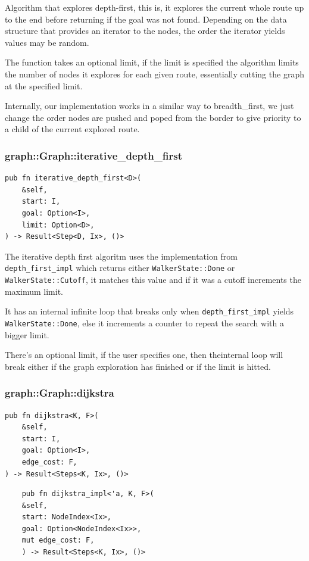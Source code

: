 Algorithm that explores depth-first, this is, it explores the current whole route up to the end before returning
if the goal was not found. Depending on the data structure that provides an iterator to the nodes, the order the
iterator yields values may be random.

The function takes an optional limit, if the limit is specified the algorithm limits the number of nodes
it explores for each given route, essentially cutting the graph at the specified limit.

Internally, our implementation works in a similar way to breadth\_first, we just change the order nodes are
pushed and poped from the border to give priority to a child of the current explored route.

\subsubsection{graph::Graph::iterative\_depth\_first}
\begin{verbatim}
pub fn iterative_depth_first<D>(
    &self,
    start: I,
    goal: Option<I>,
    limit: Option<D>,
) -> Result<Step<D, Ix>, ()>
\end{verbatim}

The iterative depth first algoritm uses the implementation from \texttt{depth\_first\_impl} which returns either
\texttt{WalkerState::Done} or \texttt{WalkerState::Cutoff}, it matches this value and if it was a cutoff
increments the maximum limit.

It has an internal infinite loop that breaks only when \texttt{depth\_first\_impl} yields \texttt{WalkerState::Done},
else it increments a counter to repeat the search with a bigger limit.

There's an optional limit, if the user specifies one, then theinternal loop will break either if the
graph exploration has finished or if the limit is hitted.

\subsubsection{graph::Graph::dijkstra}
\begin{verbatim}
pub fn dijkstra<K, F>(
    &self,
    start: I,
    goal: Option<I>,
    edge_cost: F,
) -> Result<Steps<K, Ix>, ()>
\end{verbatim}

\begin{verbatim}
    pub fn dijkstra_impl<'a, K, F>(
    &self,
    start: NodeIndex<Ix>,
    goal: Option<NodeIndex<Ix>>,
    mut edge_cost: F,
    ) -> Result<Steps<K, Ix>, ()>
\end{verbatim}

